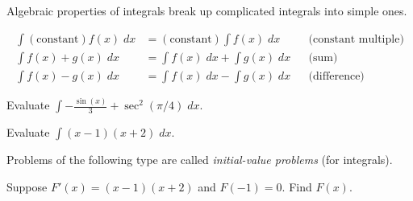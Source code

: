 \documentclass[../main.tex]{subfiles}
\begin{document}
Algebraic properties of integrals break up complicated integrals into simple ones.

\begin{thm}
  \begin{align*}
    \int (\text{constant}) f(x) \;dx
    &= (\text{constant}) \int f(x) \;dx && \text{(constant multiple)}\\
    \int f(x) + g(x) \;dx
    &= \int f(x) \;dx + \int g(x) \;dx && \text{(sum)}\\
    \int f(x) - g(x) \;dx
    &= \int f(x) \;dx - \int g(x) \;dx && \text{(difference)}
  \end{align*}

\end{thm}

\begin{example}
  Evaluate \(\int -\frac{\sin(x)}{3} + \sec^{2}(\pi/4) \;dx\).

\end{example}

\begin{exercise}
  Evaluate \(\int (x-1)(x+2) \;dx\).

  \blanks*
\end{exercise}
\clearpage

Problems of the following type are called \emph{initial-value problems} (for integrals).

\begin{example}
  Suppose \(F'(x) = (x-1)(x+2)\) and \(F(-1) = 0\).  Find \(F(x)\).

\end{example}

%
%
\end{document}
